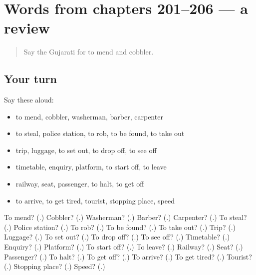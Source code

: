 \section[(dialogue)]{Words from chapters 201–206 — a review}

\label{lesson:GU-R206-review-201-206}



\begin{quote}
Say the Gujarati for to mend and cobbler.
\end{quote}

\subsection*{Your turn}
Say these aloud:

\begin{itemize}
\raggedright
  \item to mend, cobbler, washerman, barber, carpenter
  \item to steal, police station, to rob, to be found, to take out
  \item trip, luggage, to set out, to drop off, to see off
  \item timetable, enquiry, platform, to start off, to leave
  \item railway, seat, passenger, to halt, to get off
  \item to arrive, to get tired, tourist, stopping place, speed
\end{itemize}

\begin{tcolorbox}[breakable,colback=teal!4,colframe=teal!35!black,title={Before you move on}]
To mend? (\textbf{}.) Cobbler? (\textbf{}.) Washerman? (\textbf{}.) Barber? (\textbf{}.) Carpenter? (\textbf{}.) To steal? (\textbf{}.) Police station? (\textbf{}.) To rob? (\textbf{}.) To be found? (\textbf{}.) To take out? (\textbf{}.) Trip? (\textbf{}.) Luggage? (\textbf{}.) To set out? (\textbf{}.) To drop off? (\textbf{}.) To see off? (\textbf{}.) Timetable? (\textbf{}.) Enquiry? (\textbf{}.) Platform? (\textbf{}.) To start off? (\textbf{}.) To leave? (\textbf{}.) Railway? (\textbf{}.) Seat? (\textbf{}.) Passenger? (\textbf{}.) To halt? (\textbf{}.) To get off? (\textbf{}.) To arrive? (\textbf{}.) To get tired? (\textbf{}.) Tourist? (\textbf{}.) Stopping place? (\textbf{}.) Speed? (\textbf{}.)
\end{tcolorbox}
